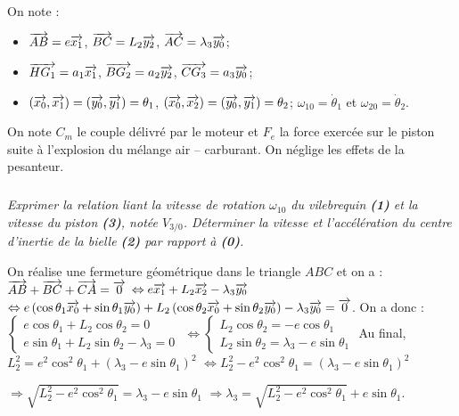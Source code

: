 \documentclass[10pt,fleqn]{article} %
\begin{document}
\begin{multicols}{2}
\begin{center}
\end{center}
\fi
On note : 
\begin{itemize}
\item $\overrightarrow{AB}=e\overrightarrow{x_1}$, $\overrightarrow{BC}=L_2\overrightarrow{y_2}$, $\overrightarrow{AC}=\lambda_3\overrightarrow{y_0}$;
\item $\overrightarrow{HG_1}=a_1\overrightarrow{x_1}$, $\overrightarrow{BG_2}=a_2\overrightarrow{y_2}$, $\overrightarrow{CG_3}=a_3\overrightarrow{y_0}$;
\item $\left(\overrightarrow{x_0},\overrightarrow{x_1}\right)=\left(\overrightarrow{y_0},\overrightarrow{y_1}\right)=\theta_1$, $\left(\overrightarrow{x_0},\overrightarrow{x_2}\right)=\left(\overrightarrow{y_0},\overrightarrow{y_1}\right)=\theta_2$; $\omega_{10}=\dot{\theta}_1$ et $\omega_{20}=\dot{\theta}_2$.
\end{itemize}

On note $C_m$ le couple délivré par le moteur et $F_e$ la force exercée sur le piston suite à l'explosion du mélange air -- carburant. On néglige les effets de la pesanteur.

\subparagraph{}
\textit{Exprimer la relation liant la vitesse de rotation $\omega_{10}$ du vilebrequin \textbf{(1)} et la vitesse du piston \textbf{(3)}, notée $V_{3/0}$. Déterminer la vitesse et l'accélération du centre d'inertie de la bielle \textbf{(2)} par rapport à \textbf{(0)}.}

\ifprof
\begin{corrige}
On réalise une fermeture géométrique dans le triangle $ABC$ et on a : 
$\overrightarrow{AB}+\overrightarrow{BC}+\overrightarrow{CA}=\overrightarrow{0}$ $\Leftrightarrow e\overrightarrow{x_1}+L_2\overrightarrow{x_2}-\lambda_3 \overrightarrow{y_0}$ $\Leftrightarrow e\left( \cos \theta_1 \overrightarrow{x_0}+\sin \theta_1 \overrightarrow{y_0} \right)+L_2\left( \cos \theta_2 \overrightarrow{x_0}+\sin \theta_2 \overrightarrow{y_0} \right)-\lambda_3 \overrightarrow{y_0} = \overrightarrow{0}$. 
On a donc : 
$\left\{
\begin{array}{l}
e\cos \theta_1 +L_2 \cos \theta_2 = 0 \\
e\sin \theta_1 + L_2 \sin \theta_2 -\lambda_3 = 0
\end{array}
\right.$
$\Leftrightarrow \left\{
\begin{array}{l}
L_2 \cos \theta_2 = -e\cos \theta_1  \\
L_2 \sin \theta_2  = \lambda_3-e\sin \theta_1
\end{array}
\right.
$
Au final, $L_2^2 = e^2\cos^2 \theta_1 + \left(\lambda_3-e\sin \theta_1\right)^2$
$\Leftrightarrow L_2^2 - e^2\cos^2 \theta_1 = \left(\lambda_3-e\sin \theta_1\right)^2$

$\Rightarrow \sqrt{L_2^2 - e^2\cos^2 \theta_1} = \lambda_3-e\sin \theta_1$
$ \Rightarrow \lambda_3 = \sqrt{L_2^2 - e^2\cos^2 \theta_1}+e\sin \theta_1$.

\end{corrige}
\else
\fi


\end{multicols}
\end{document}
